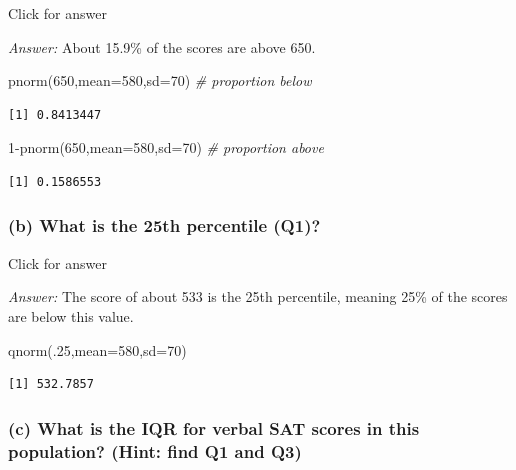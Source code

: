 \documentclass[
]{book}
\newenvironment{Shaded}{\begin{snugshade}}{\end{snugshade}}
\newcommand{\AttributeTok}[1]{\textcolor[rgb]{0.77,0.63,0.00}{#1}}
\newcommand{\CommentTok}[1]{\textcolor[rgb]{0.56,0.35,0.01}{\textit{#1}}}
\newcommand{\DecValTok}[1]{\textcolor[rgb]{0.00,0.00,0.81}{#1}}
\newcommand{\FunctionTok}[1]{\textcolor[rgb]{0.00,0.00,0.00}{#1}}
\newcommand{\NormalTok}[1]{#1}
\newcommand{\SpecialCharTok}[1]{\textcolor[rgb]{0.00,0.00,0.00}{#1}}
\begin{document}
Click for answer

\emph{Answer:} About 15.9\% of the scores are above 650.

\begin{Shaded}
\begin{Highlighting}[]
\FunctionTok{pnorm}\NormalTok{(}\DecValTok{650}\NormalTok{,}\AttributeTok{mean=}\DecValTok{580}\NormalTok{,}\AttributeTok{sd=}\DecValTok{70}\NormalTok{) }\CommentTok{\# proportion below}
\end{Highlighting}
\end{Shaded}

\begin{verbatim}
[1] 0.8413447
\end{verbatim}

\begin{Shaded}
\begin{Highlighting}[]
\DecValTok{1}\SpecialCharTok{{-}}\FunctionTok{pnorm}\NormalTok{(}\DecValTok{650}\NormalTok{,}\AttributeTok{mean=}\DecValTok{580}\NormalTok{,}\AttributeTok{sd=}\DecValTok{70}\NormalTok{) }\CommentTok{\# proportion above}
\end{Highlighting}
\end{Shaded}

\begin{verbatim}
[1] 0.1586553
\end{verbatim}

\hypertarget{b-what-is-the-25th-percentile-q1}{%
\subsubsection{(b) What is the 25th percentile (Q1)?}\label{b-what-is-the-25th-percentile-q1}}

Click for answer

\emph{Answer:} The score of about 533 is the 25th percentile, meaning 25\% of the scores are below this value.

\begin{Shaded}
\begin{Highlighting}[]
\FunctionTok{qnorm}\NormalTok{(.}\DecValTok{25}\NormalTok{,}\AttributeTok{mean=}\DecValTok{580}\NormalTok{,}\AttributeTok{sd=}\DecValTok{70}\NormalTok{)}
\end{Highlighting}
\end{Shaded}

\begin{verbatim}
[1] 532.7857
\end{verbatim}

\hypertarget{c-what-is-the-iqr-for-verbal-sat-scores-in-this-population-hint-find-q1-and-q3}{%
\subsubsection{(c) What is the IQR for verbal SAT scores in this population? (Hint: find Q1 and Q3)}\label{c-what-is-the-iqr-for-verbal-sat-scores-in-this-population-hint-find-q1-and-q3}}
\end{document}
